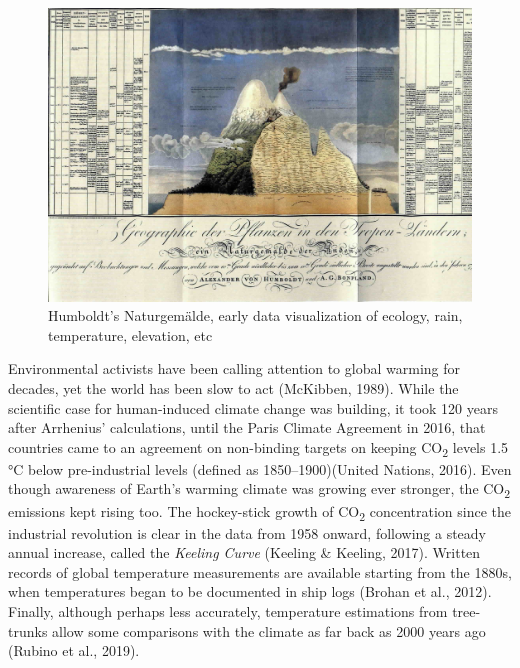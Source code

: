 \documentclass[
  letterpaper,
  DIV=11,
  numbers=noendperiod]{scrartcl}
\begin{document}
\begin{figure}[H]

{\centering \includegraphics[width=1\linewidth,height=\textheight,keepaspectratio]{./images/sustainability/humboldt.jpg}

}

\caption{Humboldt's Naturgemälde, early data visualization of ecology,
rain, temperature, elevation, etc}

\end{figure}%

Environmental activists have been calling attention to global warming
for decades, yet the world has been slow to act (McKibben, 1989). While
the scientific case for human-induced climate change was building, it
took 120 years after Arrhenius' calculations, until the Paris Climate
Agreement in 2016, that countries came to an agreement on non-binding
targets on keeping CO\textsubscript{2} levels 1.5 °C below
pre-industrial levels (defined as 1850--1900)(United Nations, 2016).
Even though awareness of Earth's warming climate was growing ever
stronger, the CO\textsubscript{2} emissions kept rising too. The
hockey-stick growth of CO\textsubscript{2} concentration since the
industrial revolution is clear in the data from 1958 onward, following a
steady annual increase, called the \emph{Keeling Curve} (Keeling \&
Keeling, 2017). Written records of global temperature measurements are
available starting from the 1880s, when temperatures began to be
documented in ship logs (Brohan et al., 2012). Finally, although perhaps
less accurately, temperature estimations from tree-trunks allow some
comparisons with the climate as far back as 2000 years ago (Rubino et
al., 2019).
\end{document}

